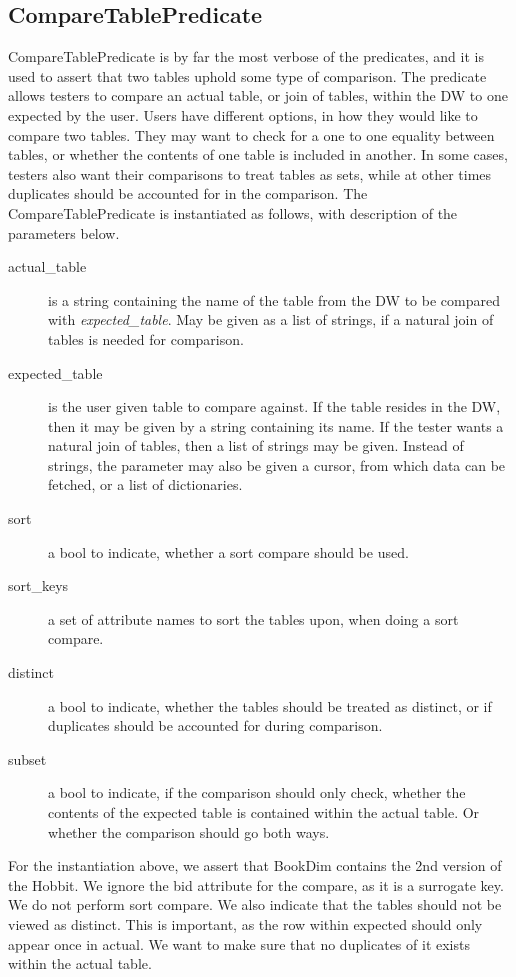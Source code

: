 \subsection{CompareTablePredicate}
CompareTablePredicate is by far the most verbose of the predicates, and it is used to assert that two tables uphold some type of comparison. The predicate allows testers to compare an actual table, or join of tables, within the DW to one expected by the user. Users have different options, in how they would like to compare two tables. They may want to check for a one to one equality between tables, or whether the contents of one table is included in another. In some cases, testers also want their comparisons to treat tables as sets, while at other times duplicates should be accounted for in the comparison. The CompareTablePredicate is instantiated as follows, with description of the parameters below.


\begin{description}
\item [actual\_table] is a string containing the name of the table from the DW to be compared with \textit{expected\_table}. May be given as a list of strings, if a natural join of tables is needed for comparison.
\item [expected\_table] is the user given table to compare against. If the table resides in the DW, then it may be given by a string containing its name. If the tester wants a natural join of tables, then a list of strings may be given. Instead of strings, the parameter may also be given a cursor, from which data can be fetched, or a list of dictionaries.
\item [sort] a bool to indicate, whether a sort compare should be used.
\item [sort\_keys] a set of attribute names to sort the tables upon, when doing a sort compare.
\item [distinct] a bool to indicate, whether the tables should be treated as distinct, or if duplicates should be accounted for during comparison.
\item [subset] a bool to indicate, if the comparison should only check, whether the contents of the expected table is contained within the actual table. Or whether the comparison should go both ways. 
\end{description}

For the instantiation above, we assert that BookDim contains the 2nd version of the Hobbit. We ignore the bid attribute for the compare, as it is a surrogate key. We do not perform sort compare. We also indicate that the tables should not be viewed as distinct. This is important, as the row within expected should only appear once in actual. We want to make sure that no duplicates of it exists within the actual table. 

